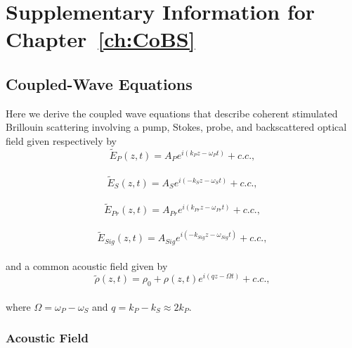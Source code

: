\doublespacing
\chapter{Supplementary Information for Chapter~\ref{ch:CoBS}}
\label{appendix: CoBS}
\acresetall


\section{Coupled-Wave Equations}
\label{Appendix:Coupled-Wave Equations}

Here we derive the coupled wave equations that describe coherent stimulated Brillouin scattering involving a pump, Stokes, probe, and backscattered optical field given respectively by
\\
\begin{equation}
    \tilde{E}_{P}(z,t) = A_{P}e^{i(k_{P}z - \omega_{P}t)} + c.c.,
    \label{eq:Pump optical field}
\end{equation}
\\
\begin{equation}
    \tilde{E}_{S}(z,t) = A_{S}e^{i(-k_{S}z - \omega_{S}t)} + c.c.,
    \label{eq:Stokes optical field}
\end{equation}
\\
\begin{equation}
    \tilde{E}_{Pr}(z,t) = A_{Pr}e^{i(k_{Pr}z - \omega_{Pr}t)} + c.c.,
    \label{eq:Probe optical field}
\end{equation}
\\
\begin{equation}
    \tilde{E}_{Sig}(z,t) = A_{Sig}e^{i(-k_{Sig}z - \omega_{Sig}t)} + c.c.,
    \label{eq:Signal optical field}
\end{equation}
\\
\noindent and a common acoustic field given by
\\
\begin{equation}
    \tilde{\rho}(z,t) = \rho_{0} + \rho(z,t)e^{i(qz - \Omega t)} + c.c.,
    \label{eq:acoustic field}
\end{equation}
\\
\noindent where \(\Omega = \omega_{P} - \omega_{S}\) and \(q = k_{P} - k_{S} \approx 2k_{P}\).


\subsection{Acoustic Field}
\label{Coupled-Wave Equations:Acoustic Field}

